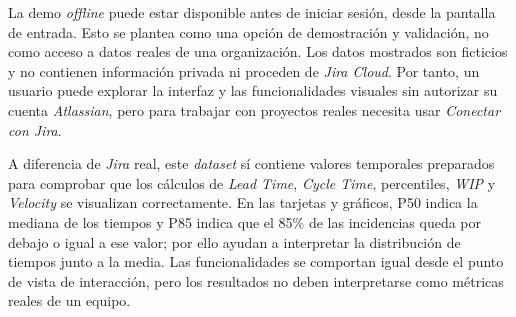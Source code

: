 \begin{refsection}
La demo \textit{offline} puede estar disponible antes de iniciar sesión, desde la pantalla de entrada. Esto se plantea como una opción de demostración y validación, no como acceso a datos reales de una organización. Los datos mostrados son ficticios y no contienen información privada ni proceden de \textit{Jira Cloud}. Por tanto, un usuario puede explorar la interfaz y las funcionalidades visuales sin autorizar su cuenta \textit{Atlassian}, pero para trabajar con proyectos reales necesita usar \textit{Conectar con Jira}.

A diferencia de \textit{Jira} real, este \textit{dataset} sí contiene valores temporales preparados para comprobar que los cálculos de \textit{Lead Time}, \textit{Cycle Time}, percentiles, \textit{WIP} y \textit{Velocity} se visualizan correctamente. En las tarjetas y gráficos, P50 indica la mediana de los tiempos y P85 indica que el 85\% de las incidencias queda por debajo o igual a ese valor; por ello ayudan a interpretar la distribución de tiempos junto a la media. Las funcionalidades se comportan igual desde el punto de vista de interacción, pero los resultados no deben interpretarse como métricas reales de un equipo.

{}
\printbibliography[heading=subbibliography]
\end{refsection}


